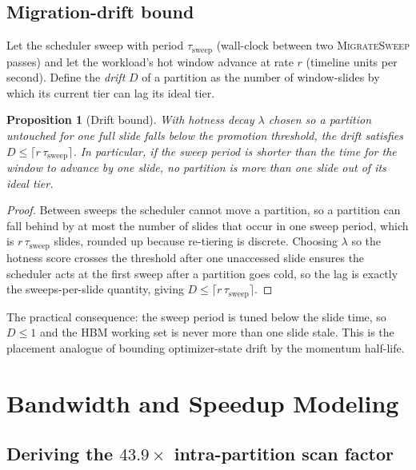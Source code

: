 \documentclass[10pt]{article}
\newtheorem{proposition}{Proposition}
\theoremstyle{definition}
\begin{document}
\subsection{Migration-drift bound}

Let the scheduler sweep with period $\tau_{\mathrm{sweep}}$ (wall-clock between two
\textsc{MigrateSweep} passes) and let the workload's hot window advance at rate $r$ (timeline units per
second). Define the \emph{drift} $D$ of a partition as the number of window-slides by which its current
tier can lag its ideal tier.

\begin{proposition}[Drift bound]
\label{prop:drift}
With hotness decay $\lambda$ chosen so a partition untouched for one full slide falls below the
promotion threshold, the drift satisfies $D\le \lceil r\,\tau_{\mathrm{sweep}}\rceil$. In particular,
if the sweep period is shorter than the time for the window to advance by one slide, no partition is
more than one slide out of its ideal tier.
\end{proposition}
\begin{proof}
Between sweeps the scheduler cannot move a partition, so a partition can fall behind by at most the
number of slides that occur in one sweep period, which is $r\,\tau_{\mathrm{sweep}}$ slides, rounded up
because re-tiering is discrete. Choosing $\lambda$ so the hotness score crosses the threshold after one
unaccessed slide ensures the scheduler acts at the first sweep after a partition goes cold, so the lag is
exactly the sweeps-per-slide quantity, giving $D\le\lceil r\,\tau_{\mathrm{sweep}}\rceil$.
\end{proof}

The practical consequence: the sweep period is tuned below the slide time, so $D\le 1$ and the HBM
working set is never more than one slide stale. This is the placement analogue of bounding optimizer-state
drift by the momentum half-life.

\section{Bandwidth and Speedup Modeling}
\label{app:cost}

\subsection{Deriving the $43.9\times$ intra-partition scan factor}
\end{document}
